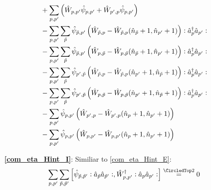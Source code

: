 \begin{appendix}
\begin{itemize}
\begin{align}
&+\sum\limits_{p, p^\prime}\left( \hat W_{ p, p^\prime}\hat \psi_{p,p^\prime}+ \hat W_{p^\prime,p}\hat \psi_{p,p^\prime}\right)\nonumber\\
&- \sum\limits_{p, p^\prime}\sum\limits_{\tilde p}\hat \psi_{\tilde p,p^\prime} \left(\hat W_{ \tilde p,p}-\hat W_{ \tilde p,p}(\hat n_{\tilde p}+1,\hat n_{p^\prime}+1)\right)\vcentcolon\hat a^\dagger_{p}\hat a_{p^\prime}\vcentcolon\nonumber\\
&-\sum\limits_{p, p^\prime}\sum\limits_{\tilde p}\hat \psi_{\tilde p,p^\prime} \left(\hat W_{p,\tilde p}-\hat W_{p,\tilde p}(\hat n_{\tilde p}+1,\hat n_{p^\prime}+1)\right)\vcentcolon\hat a^\dagger_{p}\hat a_{p^\prime}\vcentcolon \nonumber\\
&-\sum\limits_{p, p^\prime}\sum\limits_{\tilde p}\hat \psi_{p^\prime,\tilde p} \left(\hat W_{\tilde p,p}-\hat W_{\tilde p,p}(\hat n_{p^\prime}+1,\hat n_{\tilde p}+1)\right)\vcentcolon\hat a^\dagger_{p}\hat a_{p^\prime}\vcentcolon \nonumber\\
&-\sum\limits_{p, p^\prime}\sum\limits_{\tilde p}\hat \psi_{p^\prime,\tilde p} \left(\hat W_{p, \tilde p}-\hat W_{p, \tilde p}(\hat n_{p^\prime}+1,\hat n_{\tilde p}+1)\right)\vcentcolon\hat a^\dagger_{p}\hat a_{p^\prime}\vcentcolon \nonumber\\
&-\sum\limits_{p, p^\prime}\hat \psi_{p,p^\prime} \left(\hat W_{p^\prime,p}-\hat W_{p^\prime,p}(\hat n_p+1,\hat n_{p^\prime}+1)\right) \nonumber\\
&-\sum\limits_{p, p^\prime}\hat \psi_{p,p^\prime} \left(\hat W_{ p, p^\prime}-\hat W_{ p, p^\prime}(\hat n_p+1,\hat n_{p^\prime}+1)\right)\nonumber
\end{align}
\item[\textbf{\ref{com_eta_Hint_I}}:] Similiar to \ref{com_eta_Hint_E}:
\begin{align} 
\Sum_{p, p^\prime}\Sum_{\tilde p,\tilde p^\prime} \left[\hat\psi_{\tilde p,\tilde p^\prime}\NO\AN_{\tilde p}\AN_{\tilde p^\prime}\NO,\hat W_{p,p^\prime}^\dagger\NO\AN_p\AN_{p^\prime}\NO\right]\eqsec 0
\end{align}
\end{itemize}

\end{appendix}
